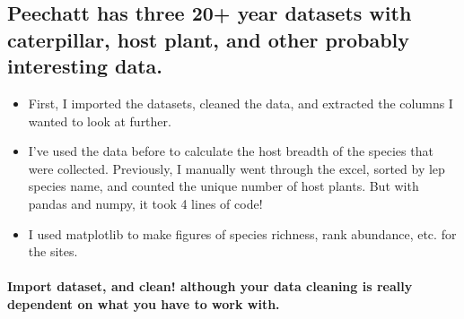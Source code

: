 \documentclass[
]{article}
\providecommand{\tightlist}{%
  \setlength{\itemsep}{0pt}\setlength{\parskip}{0pt}}
\begin{document}
\hypertarget{peechatt-has-three-20-year-datasets-with-caterpillar-host-plant-and-other-probably-interesting-data.}{%
\subsection{Peechatt has three 20+ year datasets with caterpillar, host
plant, and other probably interesting
data.}\label{peechatt-has-three-20-year-datasets-with-caterpillar-host-plant-and-other-probably-interesting-data.}}

\begin{itemize}
\tightlist
\item
  First, I imported the datasets, cleaned the data, and extracted the
  columns I wanted to look at further.
\item
  I've used the data before to calculate the host breadth of the species
  that were collected. Previously, I manually went through the excel,
  sorted by lep species name, and counted the unique number of host
  plants. But with pandas and numpy, it took 4 lines of code!
\item
  I used matplotlib to make figures of species richness, rank abundance,
  etc. for the sites.
\end{itemize}

\hypertarget{import-dataset-and-clean-although-your-data-cleaning-is-really-dependent-on-what-you-have-to-work-with.}{%
\paragraph{Import dataset, and clean! although your data cleaning is
really dependent on what you have to work
with.}\label{import-dataset-and-clean-although-your-data-cleaning-is-really-dependent-on-what-you-have-to-work-with.}}
\end{document}
